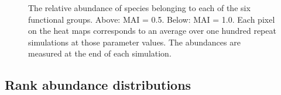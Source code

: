 \begin{itemize}
\begin{figure}[h!]
	\centering	
	\caption{The relative abundance of species belonging to each of the six functional groups. Above: MAI = 0.5. Below: MAI = 1.0. Each pixel on the heat maps corresponds to an average over one hundred repeat simulations at those parameter values. The abundances are measured at the end of each simulation.}
	\label{fig:rel_abun_fg_mai_51}
\end{figure}

\subsection{Rank abundance distributions}
\label{sec:rads}


\end{itemize}
